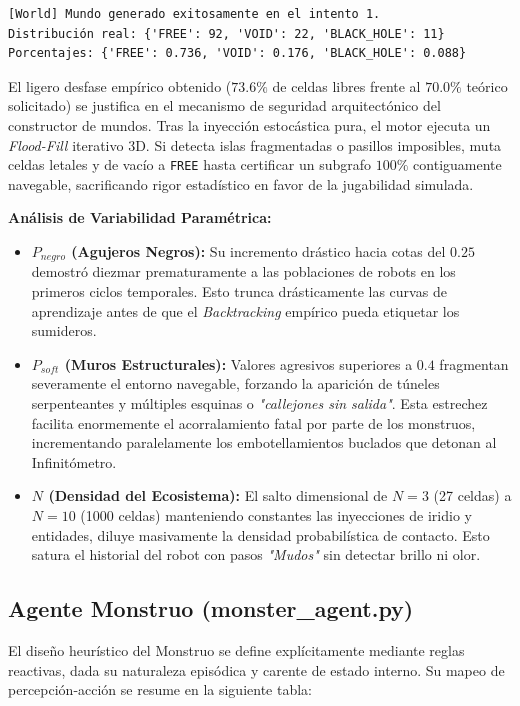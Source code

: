 \documentclass[conference]{IEEEtran}
\begin{document}
{\scriptsize
\begin{verbatim}
[World] Mundo generado exitosamente en el intento 1.
Distribución real: {'FREE': 92, 'VOID': 22, 'BLACK_HOLE': 11}
Porcentajes: {'FREE': 0.736, 'VOID': 0.176, 'BLACK_HOLE': 0.088}
\end{verbatim}
}

El ligero desfase empírico obtenido ($73.6\%$ de celdas libres frente al $70.0\%$ teórico solicitado) se justifica en el mecanismo de seguridad arquitectónico del constructor de mundos. Tras la inyección estocástica pura, el motor ejecuta un \textit{Flood-Fill} iterativo 3D. Si detecta islas fragmentadas o pasillos imposibles, muta celdas letales y de vacío a \texttt{FREE} hasta certificar un subgrafo $100\%$ contiguamente navegable, sacrificando rigor estadístico en favor de la jugabilidad simulada.

\textbf{Análisis de Variabilidad Paramétrica:}
\begin{itemize}
    \item \textbf{$P_{negro}$ (Agujeros Negros):} Su incremento drástico hacia cotas del $0.25$ demostró diezmar prematuramente a las poblaciones de robots en los primeros ciclos temporales. Esto trunca drásticamente las curvas de aprendizaje antes de que el \textit{Backtracking} empírico pueda etiquetar los sumideros.
    \item \textbf{$P_{soft}$ (Muros Estructurales):} Valores agresivos superiores a $0.4$ fragmentan severamente el entorno navegable, forzando la aparición de túneles serpenteantes y múltiples esquinas o \textit{"callejones sin salida"}. Esta estrechez facilita enormemente el acorralamiento fatal por parte de los monstruos, incrementando paralelamente los embotellamientos buclados que detonan al Infinitómetro.
    \item \textbf{$N$ (Densidad del Ecosistema):} El salto dimensional de $N=3$ (27 celdas) a $N=10$ (1000 celdas) manteniendo constantes las inyecciones de iridio y entidades, diluye masivamente la densidad probabilística de contacto. Esto satura el historial del robot con pasos \textit{"Mudos"} sin detectar brillo ni olor.
\end{itemize}

\subsection{Agente Monstruo (monster\_agent.py)}

El diseño heurístico del Monstruo se define explícitamente mediante reglas reactivas, dada su naturaleza episódica y carente de estado interno. Su mapeo de percepción-acción se resume en la siguiente tabla:
\end{document}
